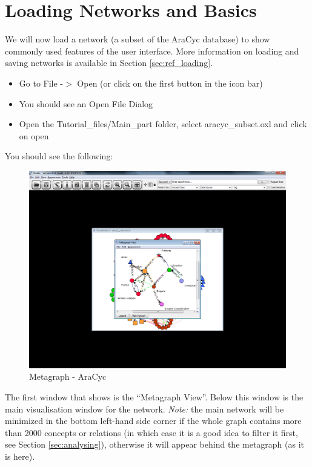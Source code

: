 \section{Loading Networks and Basics}
\label{sec:loading}
We will now load a network (a subset of the AraCyc database) to show commonly used features of the user interface.
More information on loading and saving networks is available in Section \ref{sec:ref_loading}.
\begin{itemize}
\item Go to File -$>$ Open  (or click on the first button in the icon bar)
\item You should see an Open File Dialog
\item Open the Tutorial\_files/Main\_part folder, select aracyc\_subset.oxl and click on open
\end{itemize}
You should see the following:
\begin{figure}[H]
\centering
\includegraphics[scale=0.3]{images/Jun12/launched_aracyc_subset.png}
\caption{Metagraph - AraCyc}
\label{fig:metagraph_aracyc}
\end{figure}

The first window that shows is the ``Metagraph View''. Below this window is the main visualisation window for the network.
\emph{Note:} the main network will be minimized in the bottom left-hand side corner if the whole graph contains more than 2000 concepts or relations (in which case it is a good idea to filter it first, see Section \ref{sec:analysing}), otherwise it will appear behind the metagraph (as it is here). 

